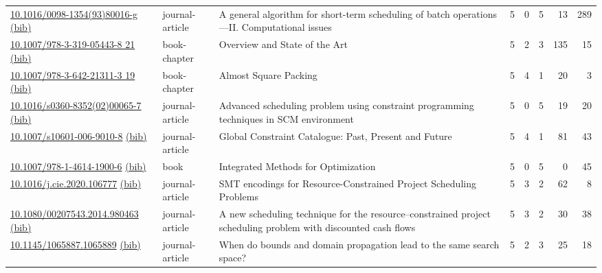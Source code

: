 {\begin{longtable}{p{5cm}lp{11cm}rrrrr}
\href{http://dx.doi.org/10.1016/0098-1354(93)80016-g}{10.1016/0098-1354(93)80016-g} \href{https://www.doi2bib.org/bib/10.1016/0098-1354(93)80016-g}{(bib)} & journal-article & A general algorithm for short-term scheduling of batch operations—II. Computational issues & 5 & 0 & 5 & 13 & 289 \\
\href{http://dx.doi.org/10.1007/978-3-319-05443-8_21}{10.1007/978-3-319-05443-8 21} \href{https://www.doi2bib.org/bib/10.1007/978-3-319-05443-8_21}{(bib)} & book-chapter & Overview and State of the Art & 5 & 2 & 3 & 135 & 15 \\
\href{http://dx.doi.org/10.1007/978-3-642-21311-3_19}{10.1007/978-3-642-21311-3 19} \href{https://www.doi2bib.org/bib/10.1007/978-3-642-21311-3_19}{(bib)} & book-chapter & Almost Square Packing & 5 & 4 & 1 & 20 & 3 \\
\href{http://dx.doi.org/10.1016/s0360-8352(02)00065-7}{10.1016/s0360-8352(02)00065-7} \href{https://www.doi2bib.org/bib/10.1016/s0360-8352(02)00065-7}{(bib)} & journal-article & Advanced scheduling problem using constraint programming techniques in SCM environment & 5 & 0 & 5 & 19 & 20 \\
\href{http://dx.doi.org/10.1007/s10601-006-9010-8}{10.1007/s10601-006-9010-8} \href{https://www.doi2bib.org/bib/10.1007/s10601-006-9010-8}{(bib)} & journal-article & Global Constraint Catalogue: Past, Present and Future & 5 & 4 & 1 & 81 & 43 \\
\href{http://dx.doi.org/10.1007/978-1-4614-1900-6}{10.1007/978-1-4614-1900-6} \href{https://www.doi2bib.org/bib/10.1007/978-1-4614-1900-6}{(bib)} & book & Integrated Methods for Optimization & 5 & 0 & 5 & 0 & 45 \\
\href{http://dx.doi.org/10.1016/j.cie.2020.106777}{10.1016/j.cie.2020.106777} \href{https://www.doi2bib.org/bib/10.1016/j.cie.2020.106777}{(bib)} & journal-article & SMT encodings for Resource-Constrained Project Scheduling Problems & 5 & 3 & 2 & 62 & 8 \\
\href{http://dx.doi.org/10.1080/00207543.2014.980463}{10.1080/00207543.2014.980463} \href{https://www.doi2bib.org/bib/10.1080/00207543.2014.980463}{(bib)} & journal-article & A new scheduling technique for the resource–constrained project scheduling problem with discounted cash flows & 5 & 3 & 2 & 30 & 38 \\
\href{http://dx.doi.org/10.1145/1065887.1065889}{10.1145/1065887.1065889} \href{https://www.doi2bib.org/bib/10.1145/1065887.1065889}{(bib)} & journal-article & When do bounds and domain propagation lead to the same search space? & 5 & 2 & 3 & 25 & 18 \\

\end{longtable}}
